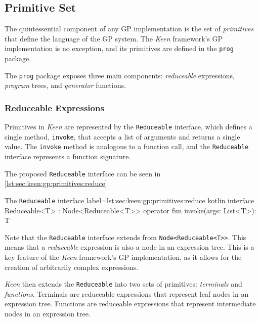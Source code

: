 
\subsection{Primitive Set}
\label{sec:keen:gp:primitives}
  The quintessential component of any GP implementation is the set of
  \textit{primitives} that define the language of the GP system. The
  \textit{Keen} framework's GP implementation is no exception, and its
  primitives are defined in the \texttt{prog} package.

  The \texttt{prog} package exposes three main components: \emph{reduceable}
  expressions, \emph{program} trees, and \emph{generator} functions.

  \subsubsection{Reduceable Expressions}
    Primitives in \textit{Keen} are represented by the \texttt{Reduceable}
    interface, which defines a single method, \texttt{invoke}, that accepts a
    list of arguments and returns a single value. The \texttt{invoke} method
    is analogous to a function call, and the \texttt{Reduceable} interface
    represents a function signature.

    The proposed \texttt{Reduceable} interface can be seen in 
    \vref{lst:sec:keen:gp:primitives:reduce}.

    \begin{code}{
      The \texttt{Reduceable} interface
    }{
      label=lst:sec:keen:gp:primitives:reduce
    }{kotlin}
      interface Reduceable<T> : Node<Reduceable<T>> {
          operator fun invoke(args: List<T>): T
      }      
    \end{code}

    Note that the \texttt{Reduceable} interface extends from 
    \texttt{Node<Reduceable<T>>}.
    This means that a \emph{reduceable} expression is also a node in an
    expression tree. This is a key feature of the \textit{Keen} framework's
    GP implementation, as it allows for the creation of arbitrarily complex
    expressions.

    \textit{Keen} then extends the \texttt{Reduceable} into two sets of
    primitives: \emph{terminals} and \emph{functions}. Terminals are
    reduceable expressions that represent leaf nodes in an expression tree.
    Functions are reduceable expressions that represent intermediate nodes in
    an expression tree.

